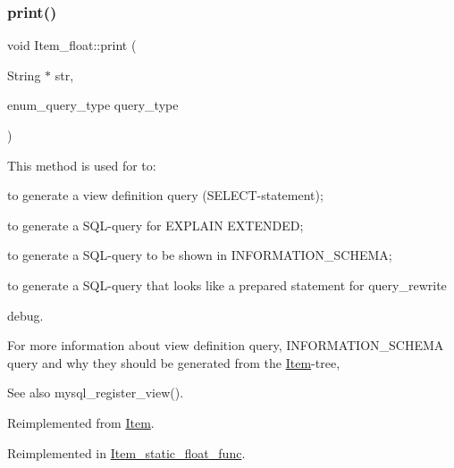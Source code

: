 \mbox{\label{classItem__float_a968cc4aafdeab156d234f92e5bcc2f9d}} 
\subsubsection{\texorpdfstring{print()}{print()}}
{\footnotesize\ttfamily void Item\+\_\+float\+::print (\begin{DoxyParamCaption}\item[{String $\ast$}]{str,  }\item[{enum\+\_\+query\+\_\+type}]{query\+\_\+type }\end{DoxyParamCaption})\hspace{0.3cm}{\ttfamily [virtual]}}

This method is used for to\+:
\begin{DoxyItemize}
\item to generate a view definition query (S\+E\+L\+E\+CT-\/statement);
\item to generate a S\+QL-\/query for E\+X\+P\+L\+A\+IN E\+X\+T\+E\+N\+D\+ED;
\item to generate a S\+QL-\/query to be shown in I\+N\+F\+O\+R\+M\+A\+T\+I\+O\+N\+\_\+\+S\+C\+H\+E\+MA;
\item to generate a S\+QL-\/query that looks like a prepared statement for query\+\_\+rewrite
\item debug.
\end{DoxyItemize}

For more information about view definition query, I\+N\+F\+O\+R\+M\+A\+T\+I\+O\+N\+\_\+\+S\+C\+H\+E\+MA query and why they should be generated from the \mbox{\hyperlink{classItem}{Item}}-\/tree, \begin{DoxySeeAlso}{See also}
mysql\+\_\+register\+\_\+view(). 
\end{DoxySeeAlso}


Reimplemented from \mbox{\hyperlink{classItem_aa7ba4bde739d83adec8edf3bf1596d94}{Item}}.



Reimplemented in \mbox{\hyperlink{classItem__static__float__func_a01626caaf912493b016fc9b0d8eb7349}{Item\+\_\+static\+\_\+float\+\_\+func}}.

\mbox{\label{classItem__float_a8114dff591bc7627fb9280e164443783}} 

